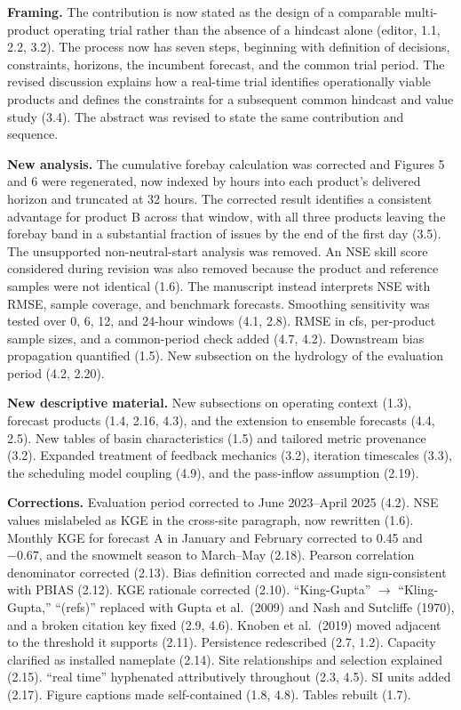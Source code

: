 \documentclass[11pt]{article}
\begin{document}
\textbf{Framing.} The contribution is now stated as the design of a comparable multi-product operating
trial rather than the absence of a hindcast alone (editor, 1.1, 2.2, 3.2). The process now has seven
steps, beginning with definition of decisions, constraints, horizons, the incumbent forecast, and the
common trial period. The revised discussion explains how a real-time trial identifies operationally
viable products and defines the constraints for a subsequent common hindcast and value study (3.4).
The abstract was revised to state the same contribution and sequence.

\textbf{New analysis.} The cumulative forebay calculation was corrected and Figures 5 and 6 were
regenerated, now indexed by hours into each product's delivered horizon and truncated at 32 hours.
The corrected result identifies a consistent advantage for product B across that window, with all
three products leaving the forebay band in a substantial fraction of issues by the end of the first
day (3.5). The unsupported non-neutral-start
analysis was removed. An NSE skill score considered during revision was also removed because the
product and reference samples were not identical (1.6). The manuscript instead interprets NSE with
RMSE, sample coverage, and benchmark forecasts. Smoothing sensitivity was tested over
0, 6, 12, and 24-hour windows (4.1, 2.8). RMSE in cfs, per-product sample sizes, and a common-period check
added (4.7, 4.2). Downstream bias propagation quantified (1.5). New subsection on the hydrology of the
evaluation period (4.2, 2.20).

\textbf{New descriptive material.} New subsections on operating context (1.3), forecast products (1.4,
2.16, 4.3), and the extension to ensemble forecasts (4.4, 2.5). New tables of basin characteristics (1.5)
and tailored metric provenance (3.2). Expanded treatment of feedback mechanics (3.2), iteration
timescales (3.3), the scheduling model coupling (4.9), and the pass-inflow assumption (2.19).

\textbf{Corrections.} Evaluation period corrected to June 2023--April 2025 (4.2). NSE values mislabeled as
KGE in the cross-site paragraph, now rewritten (1.6). Monthly KGE for forecast A in January and February
corrected to 0.45 and $-0.67$, and the snowmelt season to March--May (2.18). Pearson correlation
denominator corrected (2.13). Bias definition corrected and made sign-consistent with PBIAS (2.12). KGE
rationale corrected (2.10). ``King-Gupta'' $\rightarrow$ ``Kling-Gupta,'' ``(refs)'' replaced with Gupta
et al.\ (2009) and Nash and Sutcliffe (1970), and a broken citation key fixed (2.9, 4.6). Knoben et al.\
(2019) moved adjacent to the threshold it supports (2.11). Persistence redescribed (2.7, 1.2). Capacity
clarified as installed nameplate (2.14). Site relationships and selection explained (2.15). ``real time''
hyphenated attributively throughout (2.3, 4.5). SI units added (2.17). Figure captions made
self-contained (1.8, 4.8). Tables rebuilt (1.7).
\end{document}
